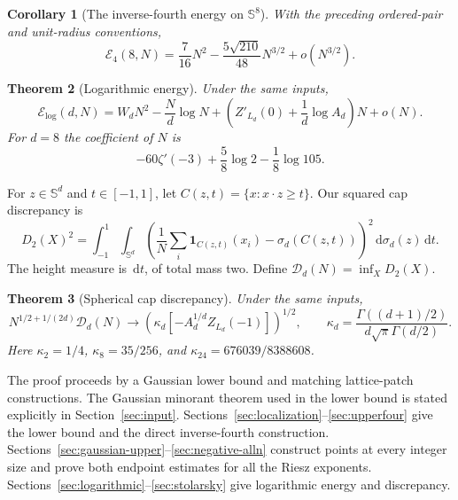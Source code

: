 \documentclass[11pt,a4paper]{article}
\newtheorem{theorem}{Theorem}[section]
\newtheorem{corollary}[theorem]{Corollary}
\theoremstyle{definition}
\newcommand{\Sph}{\mathbb S}
\newcommand{\cE}{\mathcal E}
\newcommand{\cD}{\mathcal D}
\newcommand{\dd}{\,\mathrm d}
\newcommand{\one}{\mathbf1}
\numberwithin{equation}{section}
\begin{document}
\begin{corollary}[The inverse-fourth energy on $\Sph^8$]\label{cor:s8four}
With the preceding ordered-pair and unit-radius conventions,
\begin{equation}\label{eq:s8four}
 \cE_4(8,N)=\frac7{16}N^2-\frac{5\sqrt{210}}{48}N^{3/2}+o(N^{3/2}).
\end{equation}
\end{corollary}

\begin{theorem}[Logarithmic energy]\label{thm:log}
Under the same inputs,
\begin{equation}\label{eq:logmain}
 \cE_{\log}(d,N)=W_dN^2-\frac Nd\log N+
 \left(Z'_{L_d}(0)+\frac1d\log A_d\right)N+o(N).
\end{equation}
For $d=8$ the coefficient of $N$ is
\begin{equation}\label{eq:log8}
 -60\zeta'(-3)+\frac58\log2-\frac18\log105.
\end{equation}
\end{theorem}

For $z\in\Sph^d$ and $t\in[-1,1]$, let $C(z,t)=\{x:x\cdot z\ge t\}$. Our squared cap discrepancy is
\begin{equation}\label{eq:discdef}
 D_2(X)^2=\int_{-1}^1\int_{\Sph^d}
 \left(\frac1N\sum_i\one_{C(z,t)}(x_i)-\sigma_d(C(z,t))\right)^2
 \dd\sigma_d(z)\dd t.
\end{equation}
The height measure is $\dd t$, of total mass two. Define $\cD_d(N)=\inf_XD_2(X)$.

\begin{theorem}[Spherical cap discrepancy]\label{thm:disc}
Under the same inputs,
\begin{equation}\label{eq:discmain}
 N^{1/2+1/(2d)}\cD_d(N)\longrightarrow
 \left(\kappa_d[-A_d^{1/d}Z_{L_d}(-1)]\right)^{1/2},\qquad
 \kappa_d=\frac{\Gamma((d+1)/2)}{d\sqrt\pi\Gamma(d/2)}.
\end{equation}
Here $\kappa_2=1/4$, $\kappa_8=35/256$, and $\kappa_{24}=676039/8388608$.
\end{theorem}

The proof proceeds by a Gaussian lower bound and matching lattice-patch constructions. The Gaussian minorant theorem used in the lower bound is stated explicitly in Section~\ref{sec:input}. Sections~\ref{sec:localization}--\ref{sec:upperfour} give the lower bound and the direct inverse-fourth construction. Sections~\ref{sec:gaussian-upper}--\ref{sec:negative-alln} construct points at every integer size and prove both endpoint estimates for all the Riesz exponents. Sections~\ref{sec:logarithmic}--\ref{sec:stolarsky} give logarithmic energy and discrepancy.
\end{document}
